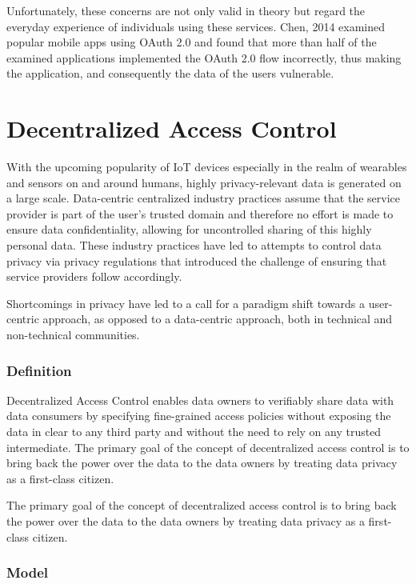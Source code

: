 \documentclass[conference]{IEEEtran}
\begin{document}
Unfortunately, these concerns are not only valid in theory but regard the everyday experience of individuals using these services.
Chen, 2014 examined popular mobile apps using OAuth 2.0 and found that more than half of the examined applications implemented the OAuth 2.0 flow incorrectly, thus making the application, and consequently the data of the users vulnerable. \cite{chen_oauth_2014}

\section{Decentralized Access Control}
With the upcoming popularity of IoT devices especially in the realm of wearables and sensors on and around humans, highly privacy-relevant data is generated on a large scale. \cite{zhang_cloud_2015}
Data-centric centralized industry practices assume that the service provider is part of the user's trusted domain and therefore no effort is made to ensure data confidentiality, allowing for uncontrolled sharing of this highly personal data. \cite{shafagh_droplet_2020}
These industry practices have led to attempts to control data privacy via privacy regulations that introduced the challenge of ensuring that service providers follow accordingly. \cite{noauthor_general_nodate}

Shortcomings in privacy have led to a call for a paradigm shift towards a user-centric approach, as opposed to a data-centric approach, both in technical and non-technical communities. \cite{ernstberger_sok_2023, shafagh_droplet_2020}

\subsubsection{Definition}
Decentralized Access Control enables data owners to verifiably share data with data consumers by specifying fine-grained access policies without exposing the data in clear to any third party and without the need to rely on any trusted intermediate.
The primary goal of the concept of decentralized access control is to bring back the power over the data to the data owners by treating data privacy as a first-class citizen. \cite{ernstberger_sok_2023}

The primary goal of the concept of decentralized access control is to bring back the power over the data to the data owners by treating data privacy as a first-class citizen.

\subsubsection{Model}
\end{document}
